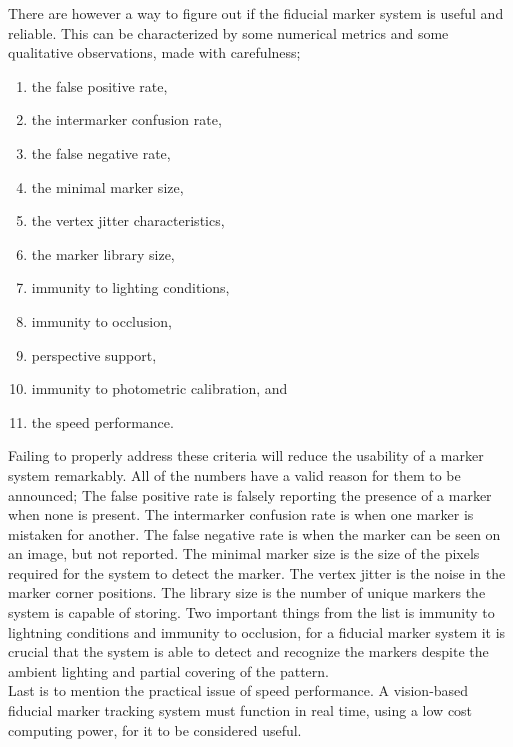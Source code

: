 				There are however a way to figure out if the fiducial marker system is useful and reliable. This can be characterized by some numerical metrics and some qualitative observations, made with carefulness;\\
				\begin{enumerate}
					\item the false positive rate,
					\item the intermarker confusion rate,
					\item the false negative rate,
					\item the minimal marker size,
					\item the vertex jitter characteristics,
					\item the marker library size,
					\item immunity to lighting conditions,
					\item immunity to occlusion,
					\item perspective support,
					\item immunity to photometric calibration, and
					\item the speed performance.\\
				\end{enumerate}
				
				Failing to properly address these criteria will reduce the usability of a marker system remarkably\cite{fiducialMarkers}. All of the numbers have a valid reason for them to be announced; The false positive rate is falsely reporting the presence of a marker when none is present. The intermarker confusion rate is when one marker is mistaken for another. The false negative rate is when the marker can be seen on an image, but not reported. The minimal marker size is the size of the pixels required for the system to detect the marker. The vertex jitter is the noise in the marker corner positions. The library size is the number of unique markers the system is capable of storing. Two important things from the list is immunity to lightning conditions and immunity to occlusion, for a fiducial marker system it is crucial that the system is able to detect and recognize the markers despite the ambient lighting and partial covering of the pattern.\\
				Last is to mention the practical issue of speed performance. A vision-based fiducial marker tracking system must function in real time, using a low cost computing power, for it to be considered useful.\\
				
